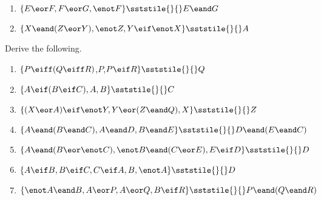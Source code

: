 \begin{enumerate}[label=(\arabic*)]
\item $\{E \eor F, F \eor G, \enot F\} \sststile{}{} E \eand G$



\item $\{X \eand (Z \eor Y), \enot Z, Y \eif \enot X\} \sststile{}{} A$  %



\end{enumerate}



\noindent\problempart Derive the following.
\begin{enumerate}[label=(\arabic*)]

\item $\{P \eiff (Q \eiff R)$,$ P$,$ P \eif R\} \sststile{}{} Q$

\item $\{A \eif (B \eif C), A, B\} \sststile{}{}C$
\item $\{(X \eor A) \eif \enot Y, Y \eor (Z \eand Q), X\} \sststile{}{}Z	$
\item $\{A \eand (B \eand C), A \eand D, B \eand E\} \sststile{}{}D \eand (E \eand C)		$
\item $\{A \eand (B \eor \enot C), \enot B \eand (C \eor E), E \eif D \} \sststile{}{} D$


\item $\{A \eif B, B \eif C, C \eif A, B, \enot A\} \sststile{}{}D	$  %
\item $\{\enot A \eand B, A \eor P, A \eor Q, B \eif R \} \sststile{}{} P \eand (Q\eand R)$


\end{enumerate}

